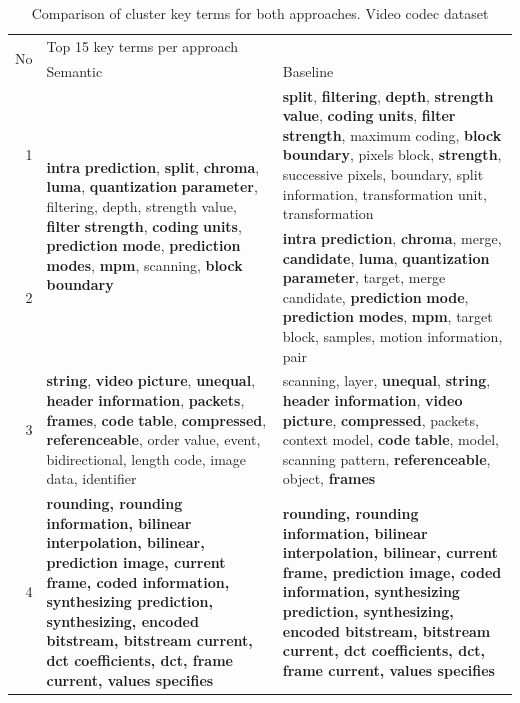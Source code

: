 \begin{table}[htbp]
  \centering
  \caption{Comparison of cluster key terms for both approaches. Video codec dataset}
    \begin{tabular}{|r|p{16em}|p{18em}|}
    \toprule
    \multicolumn{1}{|c|}{\multirow{2}[4]{*}{No}} & \multicolumn{2}{p{27.61em}|}{Top 15 key terms per approach} \\
\cmidrule{2-3}      & Semantic & Baseline \\
    \midrule
    1 & \multirow{2}[4]{=}{\textbf{intra} \textbf{prediction},  \textbf{split},  \textbf{chroma},  \textbf{luma},  \textbf{quantization} \textbf{parameter},  filtering,  depth,  strength value,  \textbf{filter} \textbf{strength},  \textbf{coding} \textbf{units},  \textbf{prediction} \textbf{mode},  \textbf{prediction} \textbf{modes},  \textbf{mpm},  scanning,  \textbf{block} \textbf{boundary}} & \textbf{split},  \textbf{filtering},  \textbf{depth},  \textbf{strength} \textbf{value},  \textbf{coding} \textbf{units},  \textbf{filter} \textbf{strength},  maximum coding,  \textbf{block} \textbf{boundary},  pixels block,  \textbf{strength},  successive pixels,  boundary,  split information,  transformation unit,  transformation \\
\cmidrule{1-1}\cmidrule{3-3}    2 & \multicolumn{1}{l|}{} & \textbf{intra} \textbf{prediction},  \textbf{chroma},  merge,  \textbf{candidate},  \textbf{luma},  \textbf{quantization} \textbf{parameter},  target,  merge candidate,  \textbf{prediction} \textbf{mode},  \textbf{prediction} \textbf{modes},  \textbf{mpm},  target block,  samples,  motion information,  pair \\
    \midrule
    3 & \textbf{string},  \textbf{video} \textbf{picture},  \textbf{unequal},  \textbf{header} \textbf{information},  \textbf{packets},  \textbf{frames},  \textbf{code} \textbf{table},  \textbf{compressed},  \textbf{referenceable},  order value,  event,  bidirectional,  length code,  image data,  identifier & scanning,  layer,  \textbf{unequal},  \textbf{string},  \textbf{header} \textbf{information},  \textbf{video} \textbf{picture},  \textbf{compressed},  packets,  context model,  \textbf{code} \textbf{table},  model,  scanning pattern,  \textbf{referenceable},  object,  \textbf{frames} \\
    \midrule
    4 & \textbf{rounding,  rounding information,  bilinear interpolation,  bilinear,  prediction image,  current frame,  coded information,  synthesizing prediction,  synthesizing,  encoded bitstream, bitstream current,  dct coefficients,  dct,  frame current,  values specifies} & \textbf{rounding,  rounding information,  bilinear interpolation,  bilinear,  current frame,  prediction image,  coded information,  synthesizing prediction,  synthesizing,  encoded bitstream,  bitstream current,  dct coefficients,  dct,  frame current,  values specifies} \\

\end{tabular}
\end{table}

